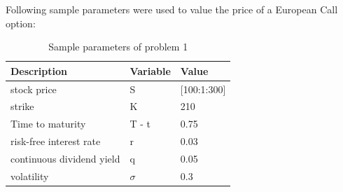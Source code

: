 \documentclass[a4paper,11pt]{article}
\begin{document}
Following sample parameters were used to value the price of a European Call option:

\begin{table}[!h]
\centering
\caption{Sample parameters of problem 1}
\begin{tabular}{l|l|l}
\textbf{Description} & \textbf{Variable} & \textbf{Value}  \\\hline
 stock price& S  & [100:1:300]  \\
 strike& K  & 210 \\
 Time to maturity& T - t  & 0.75 \\
 risk-free interest rate& r & 0.03 \\
 continuous dividend yield& q & 0.05  \\
 volatility& $\sigma$ & 0.3 
\end{tabular}
\end{table}
\end{document}
